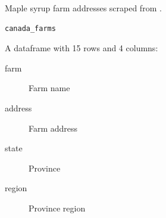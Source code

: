 %
\begin{Description}
Maple syrup farm addresses scraped from
.
\end{Description}
%
\begin{Usage}
\begin{verbatim}
canada_farms
\end{verbatim}
\end{Usage}
%
\begin{Format}
%
\begin{SubSection}{}

A dataframe with 15 rows and 4 columns:
\begin{description}

\item[farm] Farm name
\item[address] Farm address
\item[state] Province
\item[region] Province region

\end{description}

\end{SubSection}

\end{Format}
